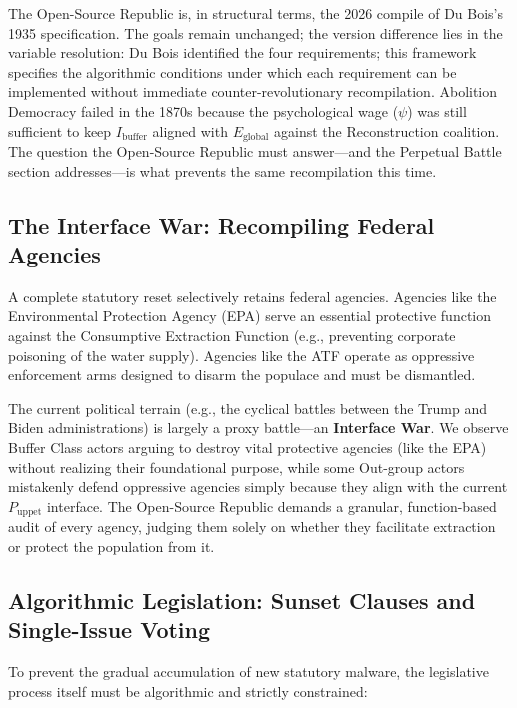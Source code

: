 The Open-Source Republic is, in structural terms, the 2026 compile of Du Bois's 1935 specification. The goals remain unchanged; the version difference lies in the variable resolution: Du Bois identified the four requirements; this framework specifies the algorithmic conditions under which each requirement can be implemented without immediate counter-revolutionary recompilation. Abolition Democracy failed in the 1870s because the psychological wage ($\psi$) was still sufficient to keep $I_{\text{buffer}}$ aligned with $E_{\text{global}}$ against the Reconstruction coalition. The question the Open-Source Republic must answer---and the Perpetual Battle section addresses---is what prevents the same recompilation this time.

\subsection{The Interface War: Recompiling Federal Agencies}

A complete statutory reset selectively retains federal agencies. Agencies like the Environmental Protection Agency (EPA) serve an essential protective function against the Consumptive Extraction Function (e.g., preventing corporate poisoning of the water supply). Agencies like the ATF operate as oppressive enforcement arms designed to disarm the populace and must be dismantled.

The current political terrain (e.g., the cyclical battles between the Trump and Biden administrations) is largely a proxy battle—an \textbf{Interface War}. We observe Buffer Class actors arguing to destroy vital protective agencies (like the EPA) without realizing their foundational purpose, while some Out-group actors mistakenly defend oppressive agencies simply because they align with the current $P_{\text{uppet}}$ interface. The Open-Source Republic demands a granular, function-based audit of every agency, judging them solely on whether they facilitate extraction or protect the population from it.

\subsection{Algorithmic Legislation: Sunset Clauses and Single-Issue Voting}

To prevent the gradual accumulation of new statutory malware, the legislative process itself must be algorithmic and strictly constrained:

